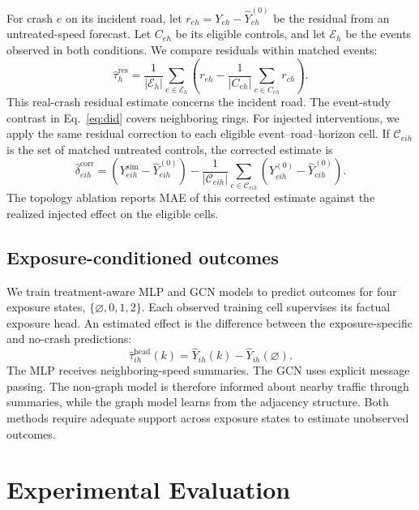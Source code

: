 \documentclass[sigconf,nonacm]{acmart}
\begin{document}
For crash $e$ on its incident road, let $r_{eh}=Y_{eh}-\widehat Y_{eh}^{(0)}$ be the residual from an untreated-speed forecast. Let $C_{eh}$ be its eligible controls, and let $\mathcal E_h$ be the events observed in both conditions. We compare residuals within matched events:
\begin{equation}
\widehat\tau_h^{\mathrm{res}}=\frac{1}{|\mathcal E_h|}
\sum_{e\in\mathcal E_h}\left(r_{eh}-\frac{1}{|C_{eh}|}
\sum_{c\in C_{eh}}r_{ch}\right).
\label{eq:residual}
\end{equation}
This real-crash residual estimate concerns the incident road. The event-study contrast in Eq.~\eqref{eq:did} covers neighboring rings. For injected interventions, we apply the same residual correction to each eligible event--road--horizon cell. If $\mathcal C_{eih}$ is the set of matched untreated controls, the corrected estimate is
\begin{equation}
\widehat\delta^{\mathrm{corr}}_{eih}
=\left(Y^{\mathrm{sim}}_{eih}-\widehat Y^{(0)}_{eih}\right)
-\frac{1}{|\mathcal C_{eih}|}\sum_{c\in\mathcal C_{eih}}
\left(Y^{(0)}_{cih}-\widehat Y^{(0)}_{cih}\right).
\label{eq:corrected}
\end{equation}
The topology ablation reports MAE of this corrected estimate against the realized injected effect on the eligible cells.

\subsection{Exposure-conditioned outcomes}
We train treatment-aware MLP and GCN models to predict outcomes for four exposure states, $\{\varnothing,0,1,2\}$. Each observed training cell supervises its factual exposure head. An estimated effect is the difference between the exposure-specific and no-crash predictions:
\begin{equation}
\widehat\tau_{ih}^{\mathrm{head}}(k)=
\widehat Y_{ih}(k)-\widehat Y_{ih}(\varnothing).
\label{eq:head}
\end{equation}
The MLP receives neighboring-speed summaries. The GCN uses explicit message passing. The non-graph model is therefore informed about nearby traffic through summaries, while the graph model learns from the adjacency structure. Both methods require adequate support across exposure states to estimate unobserved outcomes.

\section{Experimental Evaluation}
\end{document}
